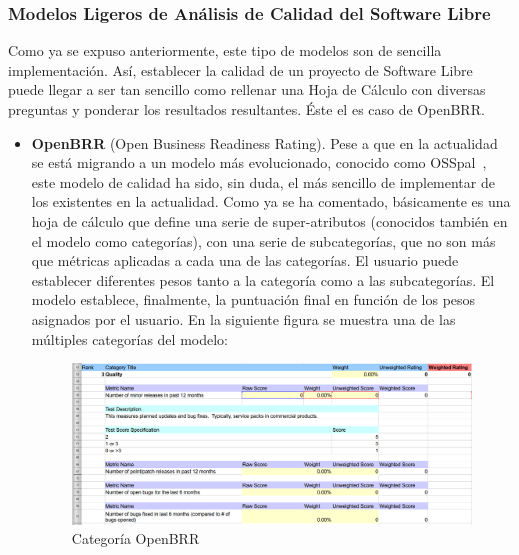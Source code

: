 \documentclass[11pt]{article}
\begin{document}
\subsubsection{Modelos Ligeros de Análisis de Calidad del Software Libre}

Como ya se expuso anteriormente, este tipo de modelos son de sencilla implementación. Así, establecer la calidad de un proyecto de Software Libre puede llegar a ser tan sencillo como rellenar una Hoja de Cálculo con diversas preguntas y ponderar los resultados resultantes. Éste el es caso de OpenBRR.

\begin{itemize}
\item{\textbf{OpenBRR}} (Open Business Readiness Rating). Pese a que en la actualidad se está migrando a un modelo más evolucionado, conocido como OSSpal~\cite{osspal:osspal}, este modelo de calidad ha sido, sin duda, el más sencillo de implementar de los existentes en la actualidad. Como ya se ha comentado, básicamente es una hoja de cálculo que define una serie de super-atributos (conocidos también en el modelo como categorías), con una serie de subcategorías, que no son más que métricas aplicadas a cada una de las categorías. El usuario puede establecer diferentes pesos tanto a la categoría como a las subcategorías. El modelo establece, finalmente, la puntuación final en función de los pesos asignados por el usuario. En la siguiente figura se muestra una de las múltiples categorías del modelo:

\begin{center}
 \begin{figure}[H]
 \begin{center}
   \includegraphics[width=16cm]{img/openbrr_extract00.png}
   \caption{Categoría OpenBRR}
   \label{fig:openbrrcategory}
 \end{center}
 \end{figure}
\end{center}


\end{itemize}
\end{document}
